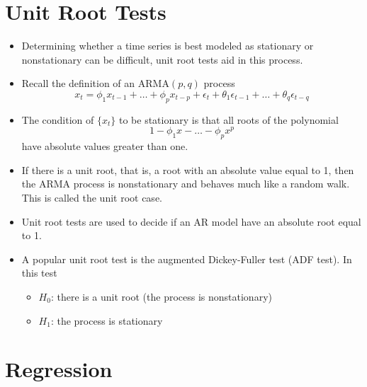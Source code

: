 \documentclass[11pt]{article}
\begin{document}
\section{Unit Root Tests}
\begin{itemize}
    \item Determining whether a time series is best modeled as stationary or nonstationary can
    be difficult, unit root tests aid in this process. 
    \item Recall the definition of an $\text{ARMA}(p,q)$ process
    \[x_t = \phi_1 x_{t-1} + \hdots + \phi_p x_{t-p} + \epsilon_t + \theta_1 \epsilon_{t-1} + 
    \hdots + \theta_q \epsilon_{t-q}\]
    \item The condition of $\{x_t\}$ to be stationary is that all roots of the polynomial 
    \[1 - \phi_1 x - \hdots - \phi_p x^p\] 
    have absolute values greater than one.
    \item If there is a unit root, that is, a root with an absolute value equal to 1, then the 
    ARMA process is nonstationary and behaves much like a random walk. This is called the unit 
    root case. 
    \item Unit root tests are used to decide if an AR model have an absolute root equal to 1.
    \item A popular unit root test is the augmented Dickey-Fuller test (ADF test). In this test
    \begin{itemize}
        \item $H_0$: there is a unit root (the process is nonstationary)
        \item $H_1$: the process is stationary
    \end{itemize}

    
\end{itemize}

\section{Regression}
\end{document}
